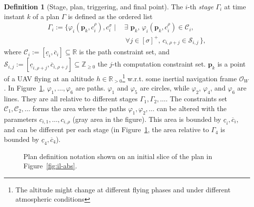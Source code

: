 \documentclass[letterpaper,10pt,conference]{ieeeconf}
\newcommand{\figpath}{./figures}
\theoremstyle{definition}
\newtheorem{defn}{Definition}[section]
\begin{document}
\begin{defn}[Stage, plan, triggering, and final point]\label{def:mission}
  The $i$-th \emph{stage} $\Gamma_i$ at time instant $k$ of a plan $\Gamma$ is defined as the ordered list
  \begin{equation*}\begin{split}
    \Gamma_i:=\{\varphi_i(\mathbf{p}_k,c_i^\rho),c_i^\sigma\mid
    \,&\exists\,\,\mathbf{p}_k,\,\varphi_i(\mathbf{p}_k,c_i^\rho)\in\mathcal{C}_i,\,\\
      &\,\forall j\in[\sigma]^+,\,c_{i,\rho+j}\in\mathcal{S}_{i,j}\,\},
  \end{split}\end{equation*}
  where $\mathcal{C}_i:=[\underline{c}_i,\overline{c}_i]\subseteq\mathbb{R}$ is the path constraint set, and $\mathcal{S}_{i,j}:=[\underline{c}_{i,\rho+j},\overline{c}_{i,\rho+j}]\subseteq\mathbb{Z}_{\geq 0}$ the $j$-th computation constraint set. $\mathbf{p}_k$ is a point of a UAV flying at an altitude $h\in\mathbb{R}_{>0}$\footnote{The altitude might change at different flying phases and under different atmospheric conditions} w.r.t. some inertial navigation frame $\mathcal{O}_W$. In Figure~\ref{fig:traj1}, $\varphi_1,\dots,\varphi_6$ are paths. $\varphi_1$ and $\varphi_5$ are circles, while $\varphi_2$, $\varphi_4$, and $\varphi_6$ are lines. They are all relative to different stages $\Gamma_1,\Gamma_2,\dots$. The constraints set $\mathcal{C}_1,\mathcal{C}_2,\dots$ forms the area where the paths $\varphi_1,\varphi_2,\dots$ can be altered with the parameters $c_{i,1},\dots,c_{i,\rho}$ (gray area in the figure). This area is bounded by $\underline{c}_i,\overline{c}_i$, and can be different per each stage (in Figure~\ref{fig:traj1}, the area relative to $\Gamma_4$ is bounded by $\underline{c}_4,\overline{c}_4$).

  \begin{figure}[t]
    \centering
    \footnotesize
    
    \caption{Plan definition notation shown on an initial slice of the plan in Figure~\ref{fig:il-abs}.}
    \label{fig:traj1}
  \end{figure}


\end{defn}
\end{document}
